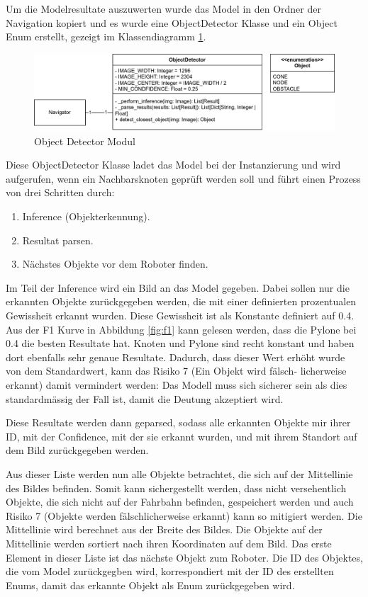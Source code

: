 Um die Modelresultate auszuwerten wurde das Model in den Ordner der Navigation kopiert und es wurde eine ObjectDetector Klasse und ein Object Enum erstellt, gezeigt im Klassendiagramm \ref{fig:nav-object-detector}.

 \begin{figure}[H]
\centering
\includegraphics[width= \textwidth ]{assets/IT/robot-sw-architecture-object-detector.png}
\caption{Object Detector Modul}
\label{fig:nav-object-detector}
\end{figure}

Diese ObjectDetector Klasse ladet das Model bei der Instanzierung und wird aufgerufen, wenn ein Nachbarsknoten geprüft werden soll und führt einen Prozess von drei Schritten durch:

\begin{enumerate}
    \item Inference (Objekterkennung).
    \item Resultat parsen.
    \item Nächstes Objekte vor dem Roboter finden.
\end{enumerate}

Im Teil der Inference wird ein Bild an das Model gegeben. Dabei sollen nur die erkannten Objekte zurückgegeben werden, die mit einer definierten prozentualen Gewissheit erkannt wurden. Diese Gewissheit ist als Konstante definiert auf 0.4. Aus der F1 Kurve in Abbildung \ref{fig:f1} kann gelesen werden, dass die Pylone bei 0.4 die besten Resultate hat. Knoten und Pylone sind recht konstant und haben dort ebenfalls sehr genaue Resultate. Dadurch, dass dieser Wert erhöht wurde von dem Standardwert, kann das Risiko 7 (Ein Objekt wird fälsch-
licherweise erkannt) damit vermindert werden: Das Modell muss sich sicherer sein als dies standardmässig der Fall ist, damit die Deutung akzeptiert wird.

Diese Resultate werden dann geparsed, sodass alle erkannten Objekte mir ihrer ID, mit der Confidence, mit der sie erkannt wurden, und mit ihrem Standort auf dem Bild zurückgegeben werden.

Aus dieser Liste werden nun alle Objekte betrachtet, die sich auf der Mittellinie des Bildes befinden. Somit kann sichergestellt werden, dass nicht versehentlich Objekte, die sich nicht auf der Fahrbahn befinden, gespeichert werden und auch Risiko 7 (Objekte werden fälschlicherweise erkannt) kann so mitigiert werden. Die Mittellinie wird berechnet aus der Breite des Bildes. Die Objekte auf der Mittellinie werden sortiert nach ihren Koordinaten auf dem Bild. Das erste Element in dieser Liste ist das nächste Objekt zum Roboter. Die ID des Objektes, die vom Model zurückgegben wird, korrespondiert mit der ID des erstellten Enums, damit das erkannte Objekt als Enum zurückgegeben wird.

